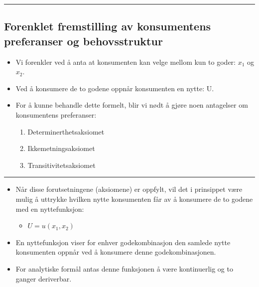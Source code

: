 \documentclass[
  letterpaper,
  DIV=11,
  numbers=noendperiod]{scrartcl}
\providecommand{\tightlist}{%
  \setlength{\itemsep}{0pt}\setlength{\parskip}{0pt}}\usepackage{longtable,booktabs,array}
\begin{document}
\begin{center}\rule{0.5\linewidth}{0.5pt}\end{center}

\subsection{Forenklet fremstilling av konsumentens preferanser og
behovsstruktur}\label{forenklet-fremstilling-av-konsumentens-preferanser-og-behovsstruktur}

\begin{itemize}
\tightlist
\item
  Vi forenkler ved å anta at konsumenten kan velge mellom kun to goder:
  \(x_1\) og \(x_2\).
\item
  Ved å konsumere de to godene oppnår konsumenten en nytte: U.
\item
  For å kunne behandle dette formelt, blir vi nødt å gjøre noen
  antagelser om konsumentens preferanser:

  \begin{enumerate}
  \def\labelenumi{\arabic{enumi}.}
  \tightlist
  \item
    Determinerthetsaksiomet
  \item
    Ikkemetningsaksiomet
  \item
    Transitivitetsaksiomet
  \end{enumerate}
\end{itemize}

\begin{center}\rule{0.5\linewidth}{0.5pt}\end{center}

\begin{itemize}
\tightlist
\item
  Når disse forutsetningene (aksiomene) er oppfylt, vil det i prinsippet
  være mulig å uttrykke hvilken nytte konsumenten får av å konsumere de
  to godene med en nyttefunksjon:

  \begin{itemize}
  \tightlist
  \item
    \(U = u(x_1, x_2)\)
  \end{itemize}
\item
  En nyttefunksjon viser for enhver godekombinasjon den samlede nytte
  konsumenten oppnår ved å konsumere denne godekombinasjonen.
\item
  For analytiske formål antas denne funksjonen å være kontinuerlig og to
  ganger deriverbar.
\end{itemize}
\end{document}
